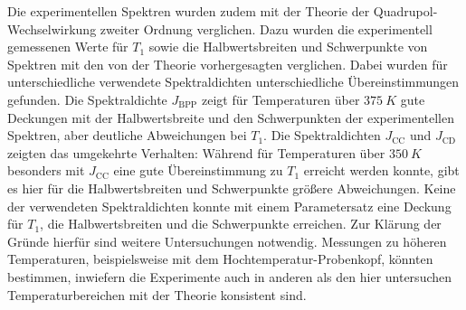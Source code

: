 Die experimentellen Spektren wurden zudem mit der Theorie der Quadrupol-Wech\-sel\-wir\-kung zweiter Ordnung verglichen. Dazu wurden die experimentell gemessenen Werte für $T_1$ sowie die Halbwertsbreiten und Schwerpunkte von Spektren mit den von der Theorie vorhergesagten verglichen. Dabei wurden für unterschiedliche verwendete Spektraldichten unterschiedliche Übereinstimmungen gefunden. Die Spektraldichte $J_\text{BPP}$ zeigt für Temperaturen über $\SI{375}{K}$ gute Deckungen mit der Halbwertsbreite und den Schwerpunkten der experimentellen Spektren, aber deutliche Abweichungen bei $T_1$. Die Spektraldichten $J_\text{CC}$ und $J_\text{CD}$ zeigten das umgekehrte Verhalten: Während für Temperaturen über $\SI{350}{K}$ besonders mit $J_\text{CC}$ eine gute Übereinstimmung zu $T_1$ erreicht werden konnte, gibt es hier für die Halbwertsbreiten und Schwerpunkte größere Abweichungen. Keine der verwendeten Spektraldichten konnte mit einem Parametersatz eine Deckung für $T_1$, die Halbwertsbreiten und die Schwerpunkte erreichen. Zur Klärung der Gründe hierfür sind weitere Untersuchungen notwendig. Messungen zu höheren Temperaturen, beispielsweise mit dem Hochtemperatur-Probenkopf, könnten bestimmen, inwiefern die Experimente auch in anderen als den hier untersuchen Temperaturbereichen mit der Theorie konsistent sind.



